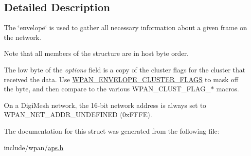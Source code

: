 \subsection{Detailed Description}
The \char`\"{}envelope\char`\"{} is used to gather all necessary information about a given frame on the network. 

Note that all members of the structure are in host byte order.

The low byte of the {\itshape options} field is a copy of the cluster flags for the cluster that received the data. Use \hyperlink{group__wpan__aps_ga6a6e8a32dc7117f44bdca2802a1e54aa}{W\-P\-A\-N\-\_\-\-E\-N\-V\-E\-L\-O\-P\-E\-\_\-\-C\-L\-U\-S\-T\-E\-R\-\_\-\-F\-L\-A\-G\-S} to mask off the byte, and then compare to the various W\-P\-A\-N\-\_\-\-C\-L\-U\-S\-T\-\_\-\-F\-L\-A\-G\-\_\-$\ast$ macros.

On a Digi\-Mesh network, the 16-\/bit network address is always set to W\-P\-A\-N\-\_\-\-N\-E\-T\-\_\-\-A\-D\-D\-R\-\_\-\-U\-N\-D\-E\-F\-I\-N\-E\-D (0x\-F\-F\-F\-E). 

The documentation for this struct was generated from the following file\-:\begin{DoxyCompactItemize}
\item 
include/wpan/\hyperlink{aps_8h}{aps.\-h}\end{DoxyCompactItemize}
